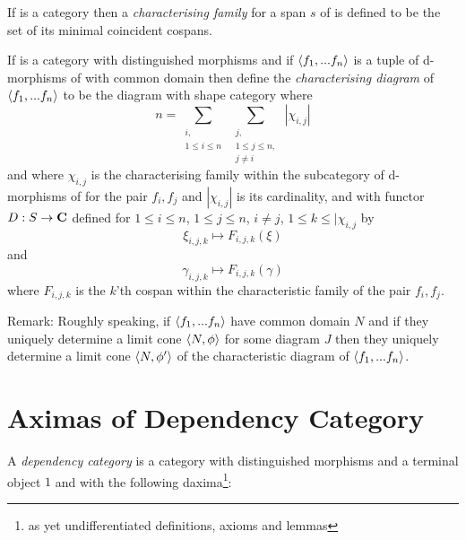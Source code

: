 \documentclass[10pt,a4paper]{scrartcl}
\begin{document}
\begin{definition}
\noindent If  is a category  then a \textit{characterising family} for a span $s$ of  is defined to be the set of its minimal coincident cospans.
\end{definition}

\noindent 
\begin{definition}
If  is a category with distinguished morphisms 
and if $\langle f_1,...f_n\rangle$ is a tuple of d-morphisms of  
with common domain then define the \textit{characterising diagram} of 
$\langle f_1,...f_n\rangle$
to be the diagram with shape category \ndidly where 
$$n = 
\sum_{\substack{i,\\1 \leq i \leq n}} \  \sum_{\substack{j,\\ 1 \leq j \leq n,\\ j \neq i}} \ | \chi_{i,j} | $$
and where $\chi_{i,j}$ is the characterising family within the subcategory 
of d-morphisms of  for the pair $f_i,f_j$ and 
$|\chi_{i,j}|$ is its cardinality,
and with functor $D: S \rightarrow \textbf{C}$ defined for $1 \leq i \leq n$, $1 \leq j \leq n$, $i \neq j$, $1 \leq k \leq | \chi_{i,j}$ by
$$ \xi_{i,j,k}   \mapsto F_{i,j,k}(\xi)$$
and
$$ \gamma_{i,j,k}   \mapsto F_{i,j,k}(\gamma) $$
where $F_{i,j,k}$ is the $k$'th cospan within the characteristic family of the pair $f_i,f_j$.
\end{definition}

\noindent
Remark: Roughly speaking, if $\langle f_1,...f_n\rangle$ have common domain $N$
and if they uniquely determine a limit cone $\langle N,\phi\rangle$ for some diagram $J$  then they uniquely determine a limit cone $\langle N,\phi'\rangle$
 of the characteristic diagram of $\langle f_1,...f_n\rangle$.


\section{Aximas of Dependency Category}
A  \textit{dependency category} 
is a category  with distinguished morphisms and a terminal object $1$ and with the following daxima\footnote{as yet undifferentiated definitions, axioms and lemmas}: 
\end{document}
